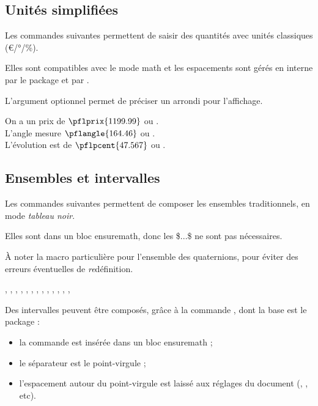 \subsection{Unités simplifiées}\label{numfmt}

\begin{tipblock}
Les commandes suivantes permettent de saisir des quantités avec unités classiques (€/°/\%).

Elles sont compatibles avec le mode \textsf{math} et les espacements sont gérés en interne par le package et par .

L'argument optionnel permet de préciser un arrondi pour l'affichage.
\end{tipblock}

\begin{PresCodeTexPL}{}
On a un prix de $\pflprix{1199.99}$ ou .\\
L'angle mesure $\pflangle{164.46}$ ou .\\
L'évolution est de $\pflpcent{47.567}$ ou .
\end{PresCodeTexPL}

\subsection{Ensembles et intervalles}

\begin{tipblock}
Les commandes suivantes permettent de composer les ensembles traditionnels, en mode \textit{tableau noir}.

Elles sont dans un bloc \textsf{ensuremath}, donc les \textsf{\$...\$} ne sont pas nécessaires.

\smallskip

À noter la macro particulière pour l'ensemble des quaternions, pour éviter des erreurs éventuelles de \textit{re}définition.
\end{tipblock}

\begin{PresCodeTexPL}{}
\N, \Z, \D, \Q, \R, \C, \ensH, \N*, \Z*, \D*, \Q*, \R*, \C*, \ensH*
\end{PresCodeTexPL}

\begin{tipblock}
Des intervalles peuvent être composés, grâce à la commande , dont la base est le package  :

\begin{itemize}
	\item la commande est insérée dans un bloc \textsf{ensuremath} ;
	\item le séparateur est le point-virgule ;
	\item l'espacement autour du point-virgule est laissé aux réglages du document (, , etc).
\end{itemize}
\vspace*{-\baselineskip}\leavevmode
\end{tipblock}

